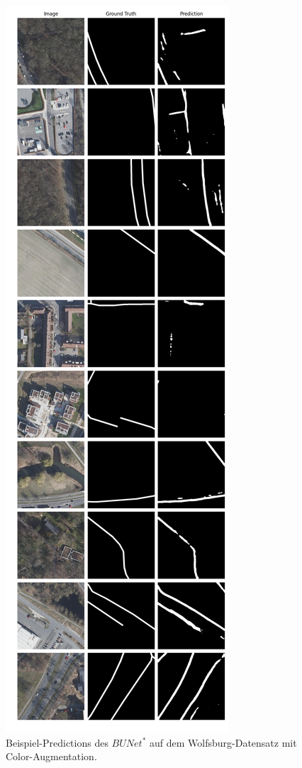 \begin{figure}
	\centering
	\includegraphics[width=.41\textwidth]{Bilder/wolfsburg-color-samples/bunet2-s.png}
	\caption{Beispiel-Predictions des $BUNet^*$ auf dem Wolfsburg-Datensatz mit Color-Augmentation.}
	\label{fig:wolfsburg-color-samples-bunet2-s}
\end{figure}

